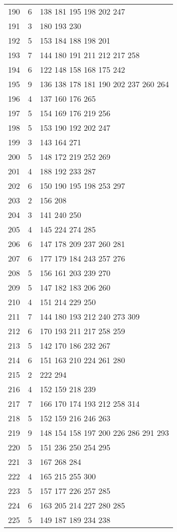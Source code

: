 \documentclass{standalone}
\begin{document}
\begin{tabular}{c c l}
190 & 6 & 138 181 195 198 202 247 \\
191 & 3 & 180 193 230 \\
192 & 5 & 153 184 188 198 201 \\
193 & 7 & 144 180 191 211 212 217 258 \\
194 & 6 & 122 148 158 168 175 242 \\
195 & 9 & 136 138 178 181 190 202 237 260 264 \\
196 & 4 & 137 160 176 265 \\
197 & 5 & 154 169 176 219 256 \\
198 & 5 & 153 190 192 202 247 \\
199 & 3 & 143 164 271 \\
200 & 5 & 148 172 219 252 269 \\
201 & 4 & 188 192 233 287 \\
202 & 6 & 150 190 195 198 253 297 \\
203 & 2 & 156 208 \\
204 & 3 & 141 240 250 \\
205 & 4 & 145 224 274 285 \\
206 & 6 & 147 178 209 237 260 281 \\
207 & 6 & 177 179 184 243 257 276 \\
208 & 5 & 156 161 203 239 270 \\
209 & 5 & 147 182 183 206 260 \\
210 & 4 & 151 214 229 250 \\
211 & 7 & 144 180 193 212 240 273 309 \\
212 & 6 & 170 193 211 217 258 259 \\
213 & 5 & 142 170 186 232 267 \\
214 & 6 & 151 163 210 224 261 280 \\
215 & 2 & 222 294 \\
216 & 4 & 152 159 218 239 \\
217 & 7 & 166 170 174 193 212 258 314 \\
218 & 5 & 152 159 216 246 263 \\
219 & 9 & 148 154 158 197 200 226 286 291 293 \\
220 & 5 & 151 236 250 254 295 \\
221 & 3 & 167 268 284 \\
222 & 4 & 165 215 255 300 \\
223 & 5 & 157 177 226 257 285 \\
224 & 6 & 163 205 214 227 280 285 \\
225 & 5 & 149 187 189 234 238 \\

\end{tabular}
\end{document}
